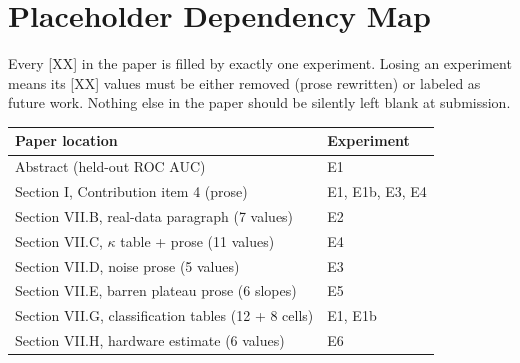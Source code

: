 \documentclass[11pt]{article}
\begin{document}
\section{Placeholder Dependency Map}

Every [XX] in the paper is filled by exactly one experiment. Losing
an experiment means its [XX] values must be either removed (prose
rewritten) or labeled as future work. Nothing else in the paper
should be silently left blank at submission.

\begin{table}[h]
\centering
\small
\begin{tabular}{ll}
\toprule
Paper location & Experiment \\
\midrule
Abstract (held-out ROC AUC)                         & E1 \\
Section I, Contribution item 4 (prose)              & E1, E1b, E3, E4 \\
Section VII.B, real-data paragraph (7 values)       & E2 \\
Section VII.C, $\kappa$ table + prose (11 values)   & E4 \\
Section VII.D, noise prose (5 values)               & E3 \\
Section VII.E, barren plateau prose (6 slopes)      & E5 \\
Section VII.G, classification tables (12 + 8 cells) & E1, E1b \\
Section VII.H, hardware estimate (6 values)         & E6 \\
\bottomrule
\end{tabular}
\end{table}
\end{document}
